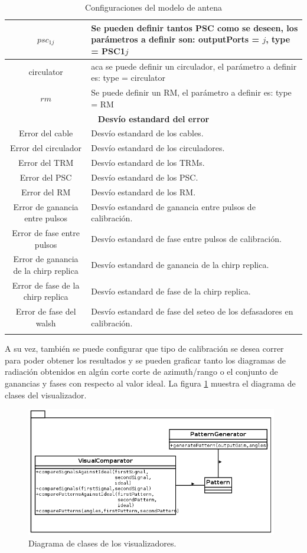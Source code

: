 \begin{center}
\begin{longtable}{|c|p{9cm}|}
	$psc_{1j}$ & Se pueden definir tantos PSC como se deseen, los parámetros a definir son: outputPorts = $j$, type = PSC1$j$ \tabularnewline \hline 
	circulator & aca se puede definir un circulador, el parámetro a definir es: type = circulator \tabularnewline \hline 
	$rm$ & Se puede definir un RM, el parámetro a definir es: type = RM \tabularnewline \hline 
	\multicolumn{2}{|c|}{\textbf{Desvío estandard del error}} \\
	\hline
	Error del cable & Desvío estandard de los cables. \tabularnewline \hline 
	Error del circulador & Desvío estandard de los circuladores. \tabularnewline \hline 
	Error del TRM & Desvío estandard de los TRMs. \tabularnewline \hline 
	Error del PSC & Desvío estandard de los PSC. \tabularnewline \hline 
	Error del RM & Desvío estandard de los RM. \tabularnewline \hline 
	Error de ganancia entre pulsos & Desvío estandard de ganancia entre pulsos de calibración. \tabularnewline \hline 
	Error de fase entre pulsos & Desvío estandard de fase entre pulsos de calibración. \tabularnewline \hline 
	Error de ganancia de la chirp replica & Desvío estandard de ganancia de la chirp replica. \tabularnewline \hline 
	Error de fase de la chirp replica & Desvío estandard de fase de la chirp replica. \tabularnewline \hline 
	Error de fase del walsh & Desvío estandard de fase del seteo de los defasadores en calibración. \tabularnewline \hline 
	\caption{Configuraciones del modelo de antena}
  \end{longtable}
  \label{tab:conf_modelo_antena}
\end{center}

A su vez, también se puede configurar que tipo de calibración se desea correr para poder obtener los resultados y se pueden 
graficar tanto los diagramas de radiación obtenidos en algún corte corte de azimuth/rango o el conjunto de ganancias y fases con 
respecto al valor ideal. La figura \ref{fig:visualPackage} muestra el diagrama de clases del visualizador.

\begin{figure}[H]
 \centering
 \includegraphics[width=11cm]{gfx/visualPackage.png}
 \caption{Diagrama de clases de los visualizadores.}
 \label{fig:visualPackage}
\end{figure}

